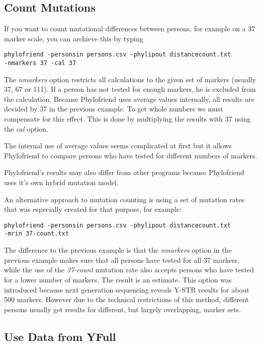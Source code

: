 \subsection{Count Mutations}

If you want to count mutational differences between
persons, for example on a 37 marker scale, you can
archieve this by typing

\noindent\texttt{phylofriend -personsin persons.csv -phylipout distancecount.txt\\
-nmarkers 37 -cal 37}

The \emph{nmarkers} option restricts all calculations
to the given set of markers (usually 37, 67 or 111). If
a person has not tested for enough markers, he is excluded
from the calculation. Because Phylofriend uses average
values internally, all results are devided by 37 in 
the previous example. To get whole numbers we must compensate
for this effect. This is done by multiplying the results
with 37 using the \emph{cal} option.

The internal use of average values seems complicated at
first but it allows Phylofriend to compare persons who
have tested for different numbers of markers.

Phylofriend's results may also differ from other programs
because Phylo\-friend uses it's own hybrid mutation model.

An alternative approach to mutation counting is using a set
of mutation rates that was especially created for that purpose,
for example:

\noindent\texttt{phylofriend -personsin persons.csv -phylipout distancecount.txt\\
-mrin 37-count.txt}

The difference to the previous example is that the \emph{nmarkers}
option in the previous example makes sure that all persons
have tested for all 37 markers, while the use of the
\emph{37-count} mutation rate also accepts persons who have
tested for a lower number of markers. The result is an estimate.
This option was introduced because next generation sequencing
reveals Y-STR results for about 500 markers. However due to
the technical restrictions of this method, different persons
usually get results for different, but largely overlapping,
marker sets.


\subsection{Use Data from YFull}

